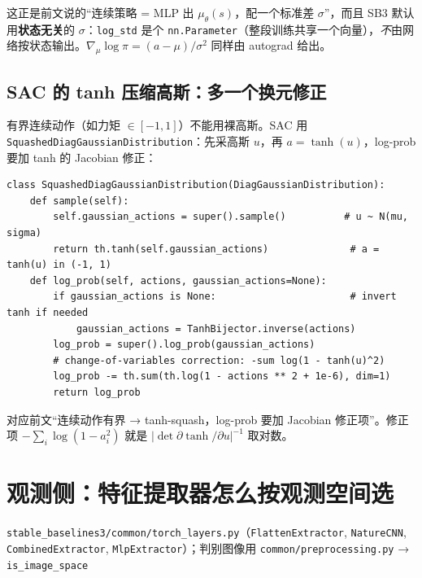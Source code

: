 \documentclass[11pt,a4paper]{article}
\begin{document}
\begin{tiebox}
这正是前文说的“连续策略 = MLP 出 $\mu_\theta(s)$，配一个标准差 $\sigma$”，而且 SB3 默认用\textbf{状态无关}的 $\sigma$：\texttt{log\_std} 是个 \texttt{nn.Parameter}（整段训练共享一个向量），\emph{不}由网络按状态输出。$\nabla_\mu\log\pi=(a-\mu)/\sigma^2$ 同样由 autograd 给出。
\end{tiebox}

\subsection{SAC 的 tanh 压缩高斯：多一个换元修正}

有界连续动作（如力矩 $\in[-1,1]$）不能用裸高斯。SAC 用 \texttt{SquashedDiagGaussianDistribution}：先采高斯 $u$，再 $a=\tanh(u)$，log-prob 要加 tanh 的 Jacobian 修正：

\begin{lstlisting}
class SquashedDiagGaussianDistribution(DiagGaussianDistribution):
    def sample(self):
        self.gaussian_actions = super().sample()          # u ~ N(mu, sigma)
        return th.tanh(self.gaussian_actions)              # a = tanh(u) in (-1, 1)
    def log_prob(self, actions, gaussian_actions=None):
        if gaussian_actions is None:                       # invert tanh if needed
            gaussian_actions = TanhBijector.inverse(actions)
        log_prob = super().log_prob(gaussian_actions)
        # change-of-variables correction: -sum log(1 - tanh(u)^2)
        log_prob -= th.sum(th.log(1 - actions ** 2 + 1e-6), dim=1)
        return log_prob
\end{lstlisting}

\begin{tiebox}
对应前文“连续动作有界 → tanh-squash，log-prob 要加 Jacobian 修正项”。修正项 $-\sum_i\log(1-a_i^2)$ 就是 $\big|\det \partial\tanh/\partial u\big|^{-1}$ 取对数。
\end{tiebox}

\section{观测侧：特征提取器怎么按观测空间选}

\begin{srcbox}
\texttt{stable\_baselines3/common/torch\_layers.py}（\texttt{FlattenExtractor}, \texttt{NatureCNN}, \texttt{CombinedExtractor}, \texttt{MlpExtractor}）；判别图像用 \texttt{common/preprocessing.py} → \texttt{is\_image\_space}
\end{srcbox}
\end{document}

